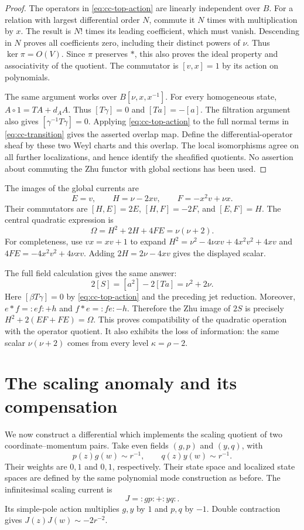 \begin{proof}
The operators in \eqref{eq:cc-top-action} are linearly independent over $B$.
For a relation with largest differential order $N$, commute it $N$ times with multiplication by $x$.
The result is $N!$ times its leading coefficient, which must vanish.
Descending in $N$ proves all coefficients zero, including their distinct powers of $\nu$.
Thus $\ker\pi=O(V)$.
Since $\pi$ preserves $*$, this also proves the ideal property and associativity of the quotient.
The commutator is $[v,x]=1$ by its action on polynomials.

The same argument works over $B[\nu,x,x^{-1}]$.
For every homogeneous state, $A\circ1=TA+d_AA$.
Thus $[T\gamma]=0$ and $[Ta]=-[a]$.
The filtration argument also gives $[\gamma^{-1}T\gamma]=0$.
Applying \eqref{eq:cc-top-action} to the full normal terms in \eqref{eq:cc-transition} gives the asserted overlap map.
Define the differential-operator sheaf by these two Weyl charts and this overlap.
The local isomorphisms agree on all further localizations, and hence identify the sheafified quotients.
No assertion about commuting the Zhu functor with global sections has been used.
\end{proof}

The images of the global currents are
\[
 E=v,\qquad H=\nu-2xv,\qquad F=-x^2v+\nu x.
\]
Their commutators are $[H,E]=2E$, $[H,F]=-2F$, and $[E,F]=H$.
The central quadratic expression is
\[
 \Omega=H^2+2H+4FE=\nu(\nu+2).
\]
For completeness, use $vx=xv+1$ to expand
$H^2=\nu^2-4\nu xv+4x^2v^2+4xv$ and
$4FE=-4x^2v^2+4\nu xv$.
Adding $2H=2\nu-4xv$ gives the displayed scalar.

The full field calculation gives the same answer:
\[
 2[S]=[a^2]-2[Ta]=\nu^2+2\nu.
\]
Here $[\beta T\gamma]=0$ by \eqref{eq:cc-top-action} and the preceding jet reduction.
Moreover, $e*f=:ef:+h$ and $f*e=:fe:-h$.
Therefore the Zhu image of $2S$ is precisely $H^2+2(EF+FE)=\Omega$.
This proves compatibility of the quadratic operation with the operator quotient.
It also exhibits the loss of information: the same scalar $\nu(\nu+2)$ comes from every level $\kappa=\rho-2$.

\section{The scaling anomaly and its compensation}

We now construct a differential which implements the scaling quotient of two coordinate--momentum pairs.
Take even fields $(g,p)$ and $(y,q)$, with
\[
 p(z)g(w)\sim r^{-1},\qquad q(z)y(w)\sim r^{-1}.
\]
Their weights are $0,1$ and $0,1$, respectively.
Their state space and localized state spaces are defined by the same polynomial mode construction as before.
The infinitesimal scaling current is
\[
 J=:gp:+:yq:.
\]
Its simple-pole action multiplies $g,y$ by $1$ and $p,q$ by $-1$.
Double contraction gives $J(z)J(w)\sim-2r^{-2}$.

